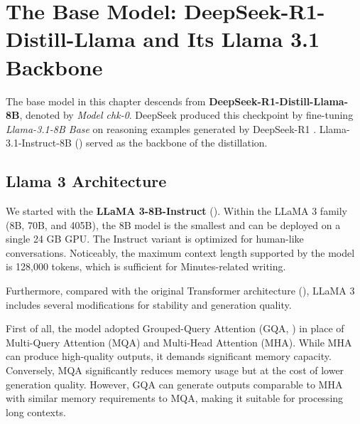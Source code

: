 



\section{The Base Model: DeepSeek-R1-Distill-Llama and Its Llama 3.1 Backbone}\label{ch2:sec:base_model}

The base model in this chapter descends from \textbf{DeepSeek-R1-Distill-Llama-8B}, denoted by \textit{Model chk-0}. DeepSeek produced this checkpoint by fine-tuning \textit{Llama-3.1-8B Base} on reasoning examples generated by DeepSeek-R1 \cite{guo2025deepseek}. Llama-3.1-Instruct-8B (\cite{llamateam2024llama3}) served as the backbone of the distillation.


\subsection*{Llama 3 Architecture}

We started with the \textbf{LLaMA 3-8B-Instruct} (\cite{meta2024llama3}). Within the LLaMA 3 family (8B, 70B, and 405B), the 8B model is the smallest and can be deployed on a single 24 GB GPU. The Instruct variant is optimized for human-like conversations. Noticeably, the maximum context length supported by the model is 128,000 tokens, which is sufficient for Minutes-related writing.



Furthermore, compared with the original Transformer architecture (\cite{vaswani2017attention}), LLaMA 3 includes several modifications for stability and generation quality.

First of all, the model adopted Grouped-Query Attention (GQA, \cite{ainslie2023gqa}) in place of Multi-Query Attention (MQA) and Multi-Head Attention (MHA). While MHA can produce high-quality outputs, it demands significant memory capacity. Conversely, MQA significantly reduces memory usage but at the cost of lower generation quality. However, GQA can generate outputs comparable to MHA with similar memory requirements to MQA, making it suitable for processing long contexts.

